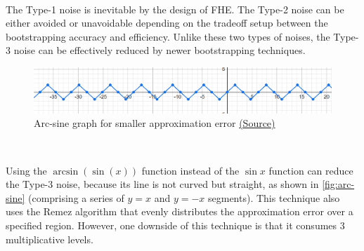 
$ $


The Type-1 noise is inevitable by the design of FHE. The Type-2 noise can be either avoided or unavoidable depending on the tradeoff setup between the bootstrapping accuracy and efficiency. Unlike these two types of noises, the Type-3 noise can be effectively reduced by newer bootstrapping techniques.  

\begin{figure}[h!]
    \centering
  \includegraphics[width=1.0\linewidth]{figures/arc-sine.png}
  \caption{Arc-sine graph for smaller approximation error \href{https://www.google.com/search?sca_esv=c744cb070de47b7e&sxsrf=ADLYWIKKaF93fcAFvJC4ehJso1E5qFTaow:1732546684173&q=arcsin(sin(x))&source=lnms&fbs=AEQNm0DmKhoYsBCHazhZSCWuALW8l8eUs1i3TeMYPF4tXSfZ95GzcfXnm5XYTvJV_9Qreh2py964ICpZJthXkELijctC8pFBYULoa3-fvQmwK0VJF0ntzsbN_W2CCJL9N57SWFNwWI58jCKaBJSdPgkprHQVK8H1PYOYWXMHTCCV-rDbC44rR6ANM870jZCZRtTKwFWtMIe2&sa=X&ved=2ahUKEwjZy6qt3_eJAxXbhlYBHXD2IvEQ0pQJegQIDxAB&cshid=1732546705369143&biw=1280&bih=635&dpr=1.5}{(Source)}}
  \label{fig:arc-sine}
\end{figure}

$ $

 Using the $\arcsin(\sin(x))$ function instead of the $\sin x$ function can reduce the Type-3 noise, because its line is not curved but straight, as shown in \autoref{fig:arc-sine} (comprising a series of $y = x$ and $y = -x$ segments). This technique also uses the Remez algorithm that evenly distributes the approximation error over a specified region. However, one downside of this technique is that it consumes 3 multiplicative levels. 

$ $

